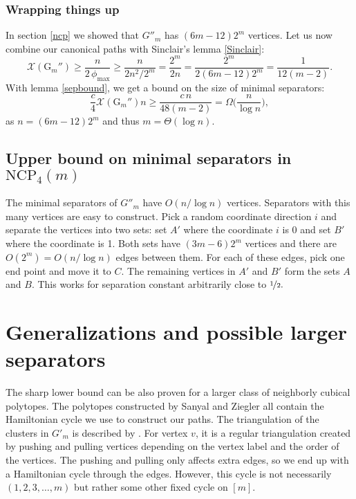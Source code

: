 \documentclass[a4paper,12pt]{book}
\theoremstyle{plain}
\theoremstyle{definition}
\newcommand\NC{\textrm{NCP}}
\newcommand\CG{\mathrm{G}}
\begin{document}
\subsection{Wrapping things up}

In section \ref{ncp} we showed that $G''_m$ has $(6m-12)2^m$ vertices. Let us
now combine our canonical paths with Sinclair's lemma \ref{Sinclair}:
\begin{equation}
\mathcal{X}(\CG_m'') 
\ge \frac{n}{2\,\phi_{\max}} 
\ge \frac{n}{2n^2/2^m}
  = \frac{2^m}{2n}
  = \frac{2^m}{2(6m-12)2^m}
  = \frac{1}{12(m-2)}. 
\end{equation}
With lemma \ref{sepbound}, we get a bound on the size of minimal separators:
\begin{equation}
\frac c4 \mathcal{X}(\CG_m'')n 
\ge \frac{c\,n}{48(m-2)} 
 =  \Omega\Big(\frac n{\log n}\Big),
\end{equation}
as $n = (6m-12)2^m$ and thus $m=\Theta(\log n)$.

\section{Upper bound on minimal separators in $\NC_4(m)$}

The minimal separators of $G''_m$ have $O(n/\log n)$ vertices. Separators with this
many vertices are easy to construct. Pick a random coordinate direction $i$ and separate
the vertices into two sets: set $A'$ where the coordinate $i$ is 0 and set $B'$ where the coordinate
is 1. Both sets have $(3m-6)2^m$ vertices and there are $O(2^m) = O(n/\log n)$ edges between them. For each of
these edges, pick one end point and move it to $C$. The remaining vertices in $A'$ and $B'$ form
the sets $A$ and $B$. This works for separation constant arbitrarily close to $\nicefrac{1}{2}.$

\chapter{Generalizations and possible larger separators}
\label{genes}

The sharp lower bound can be also proven for a larger class of neighborly cubical polytopes.
The polytopes constructed by Sanyal and Ziegler \cite{Z102} all contain the Hamiltonian
cycle we use to construct our paths. The triangulation of the clusters in $G'_m$ is described by
\cite[Thm 3.7.]{Z102}. For vertex $v$, it is a regular triangulation created by pushing 
and pulling vertices depending on the vertex label and the order of the vertices. 
The pushing and pulling only affects extra edges, so we end up with a Hamiltonian
cycle through the edges. However, this cycle is not necessarily $(1,2,3,\dots,m)$ but
rather some other fixed cycle on $[m]$.
\end{document}
